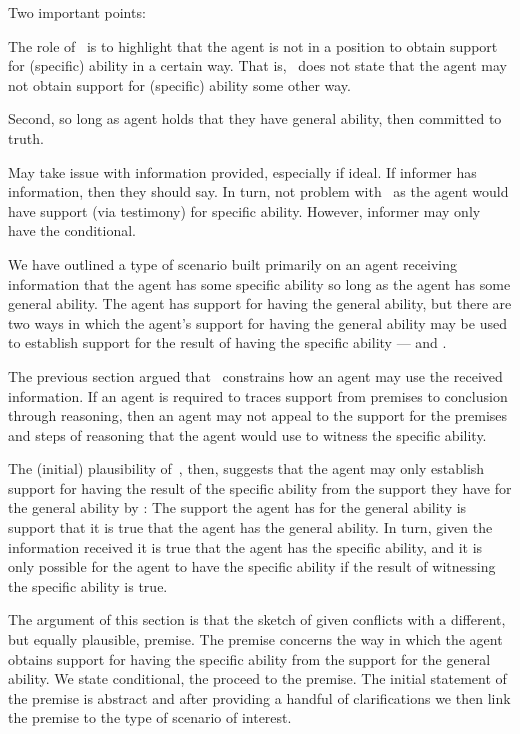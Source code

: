 \hozline{}

\begin{note}
  Two important points:

  The role of~\nI{} is to highlight that the agent is not in a position to obtain support for (specific) ability in a certain way.
  That is,~\nI{} does not state that the agent may not obtain support for (specific) ability some other way.

  Second, so long as agent holds that they have general ability, then committed to truth.

  May take issue with information provided, especially if ideal.
  If informer has information, then they should say.
  In turn, not problem with~\nI{} as the agent would have support (via testimony) for specific ability.
  However, informer may only have the conditional.
\end{note}

\hozline{}

\begin{note}
  We have outlined a type of scenario built primarily on an agent receiving information that the agent has some specific ability so long as the agent has some general ability.
  The agent has support for having the general ability, but there are two ways in which the agent's support for having the general ability may be used to establish support for {\color{red} the result of having the specific ability} --- \AR{} and \WR{}.

  The previous section argued that~\ESU{} constrains how an agent may use the received information.
  If an agent is required to traces support from premises to conclusion through reasoning, then an agent may not appeal to the support for the premises and steps of reasoning that the agent would use to witness the specific ability.

  The (initial) plausibility of~\ESU{}, then, suggests that the agent may only establish support for having the {\color{red} result of the specific ability} from the support they have for the general ability by \AR{}:
  The support the agent has for the general ability is support that it is true that the agent has the general ability.
  In turn, given the information received it is true that the agent has the specific ability, and it is only possible for the agent to have the specific ability if the result of witnessing the specific ability is true.

  The argument of this section is that the sketch of \AR{} given conflicts with a different, but equally plausible, premise.
  The premise concerns the way in which the agent obtains support for having the specific ability from the support for the general ability.
  We state conditional, the proceed to the premise.
  The initial statement of the premise is abstract and after providing a handful of clarifications we then link the premise to the type of scenario of interest.
\end{note}


